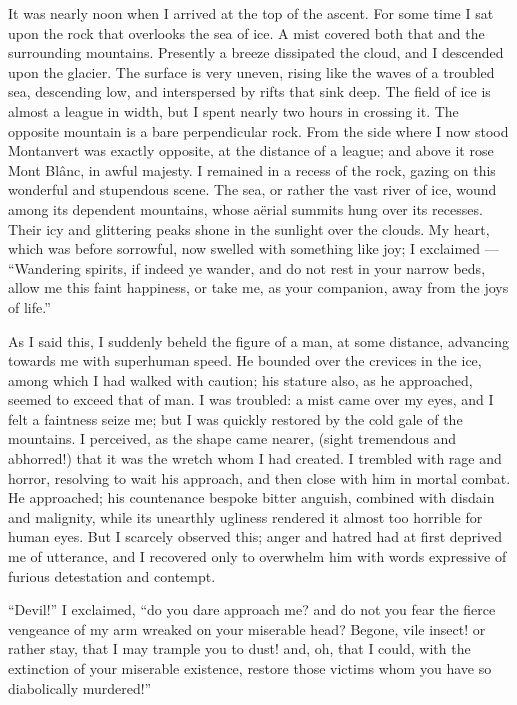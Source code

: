 It was nearly noon when I arrived at
the top of the ascent. For some time
I sat upon the rock that overlooks the
sea of ice. A mist covered both that
and the surrounding mountains. Presently
a breeze dissipated the cloud,
and I descended upon the glacier. The
surface is very uneven, rising like the
waves of a troubled sea, descending
low, and interspersed by rifts that sink
deep. The field of ice is almost a
league in width, but I spent nearly two
hours in crossing it. The opposite
mountain is a bare perpendicular rock.
From the side where I now stood Montanvert
was exactly opposite, at the distance
of a league; and above it rose
Mont Blânc, in awful majesty. I remained
in a recess of the rock, gazing
on this wonderful and stupendous scene.
The sea, or rather the vast river of ice,
wound among its dependent mountains,
whose aërial summits hung over its recesses.
Their icy and glittering peaks
shone in the sunlight over the clouds.
My heart, which was before sorrowful,
now swelled with something like joy;
I exclaimed --- ``Wandering spirits, if
indeed ye wander, and do not rest in
your narrow beds, allow me this faint
happiness, or take me, as your companion,
away from the joys of life.''

As I said this, I suddenly beheld the
figure of a man, at some distance, advancing
towards me with superhuman
speed. He bounded over the crevices
in the ice, among which I had walked
with caution; his stature also, as he
approached, seemed to exceed that of
man. I was troubled: a mist came
over my eyes, and I felt a faintness
seize me; but I was quickly restored by
the cold gale of the mountains. I perceived,
as the shape came nearer, (sight
tremendous and abhorred!) that it was
the wretch whom I had created. I
trembled with rage and horror, resolving
to wait his approach, and then
close with him in mortal combat. He
approached; his countenance bespoke
bitter anguish, combined with disdain
and malignity, while its unearthly ugliness
rendered it almost too horrible
for human eyes. But I scarcely observed
this; anger and hatred had at
first deprived me of utterance, and I
recovered only to overwhelm him with
words expressive of furious detestation
and contempt.

``Devil!'' I exclaimed, ``do you
dare approach me? and do not you fear
the fierce vengeance of my arm wreaked
on your miserable head? Begone, vile
insect! or rather stay, that I may trample
you to dust! and, oh, that I could,
with the extinction of your miserable
existence, restore those victims whom
you have so diabolically murdered!''


